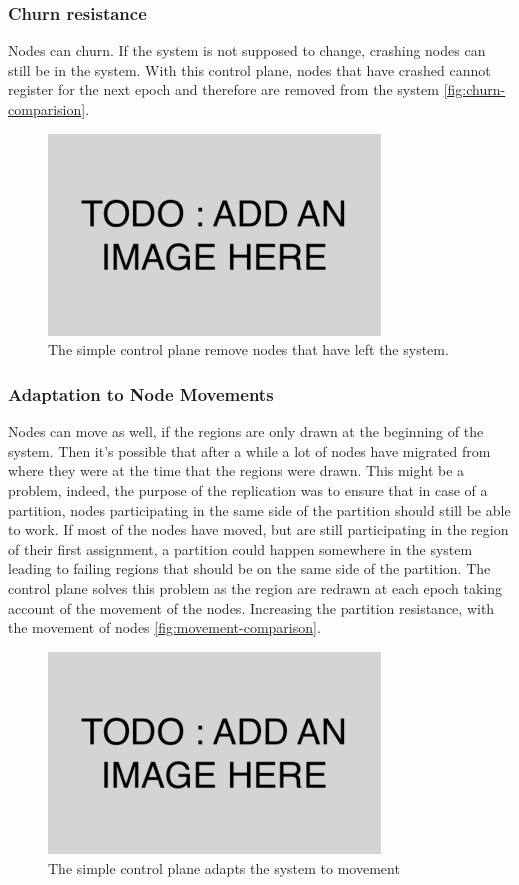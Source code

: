 \documentclass[a4paper,11pt,oneside]{report}
\begin{document}
\subsubsection{Churn resistance}
Nodes can churn. If the system is not supposed to change, crashing nodes can still be
in the system. With this control plane, nodes that have crashed cannot
register for the next epoch and therefore are removed from the system \autoref{fig:churn-comparision}. 
\begin{figure}[!h] 
\centering
\includegraphics[width=250pt]{figures/todo}
\caption{The simple control plane remove nodes that have left the system.}
\label{fig:churn-comparision}
\end{figure}

\subsubsection{Adaptation to Node Movements}
Nodes can move as well, if the regions are only drawn at the beginning of the
system. Then it's possible that after a while a lot of nodes have migrated from
where they were at the time that the regions were drawn. This might be a
problem, indeed, the purpose of the replication was to ensure that in case of a
partition, nodes participating in the same side of the partition should still
be able to work. If most of the nodes have moved, but are still participating
in the region of their first assignment, a partition could happen somewhere in
the system leading to failing regions that should be on the same side of the
partition. The control plane solves this problem as the region are redrawn at
each epoch taking account of the movement of the nodes. Increasing the
partition resistance, with the movement of nodes  \autoref{fig:movement-comparison}.
\begin{figure}[!h] 
\centering
\includegraphics[width=250pt]{figures/todo}
\caption{The simple control plane adapts the system to movement}
\label{fig:movement-comparison}
\end{figure}
\end{document}
